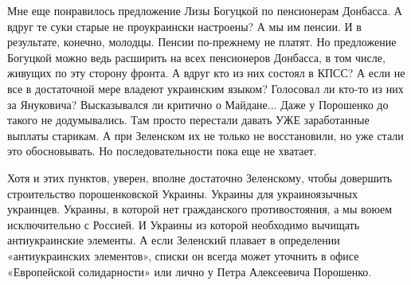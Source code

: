 Мне еще понравилось предложение Лизы Богуцкой по пенсионерам Донбасса. А вдруг
те суки старые не проукраински настроены? А мы им пенсии. И в результате,
конечно, молодцы. Пенсии по-прежнему не платят. Но предложение Богуцкой можно
ведь расширить на всех пенсионеров Донбасса, в том числе, живущих по эту
сторону фронта. А вдруг кто из них состоял в КПСС? А если не все в достаточной
мере владеют украинским языком? Голосовал ли кто-то из них за Януковича?
Высказывался ли критично о Майдане... Даже у Порошенко до такого не додумывались.
Там просто перестали давать УЖЕ заработанные выплаты старикам. А при Зеленском
их не только не восстановили, но уже стали это обосновывать. Но
последовательности пока еще не хватает.

Хотя и этих пунктов, уверен, вполне достаточно Зеленскому, чтобы довершить
строительство порошенковской Украины. Украины для украиноязычных украинцев.
Украины, в которой нет гражданского противостояния, а мы воюем исключительно с
Россией. И Украины из которой необходимо вычищать антиукраинские элементы. А
если Зеленский плавает в определении «антиукраинских элементов», списки он
всегда может уточнить в офисе «Европейской солидарности» или лично у Петра
Алексеевича Порошенко.
